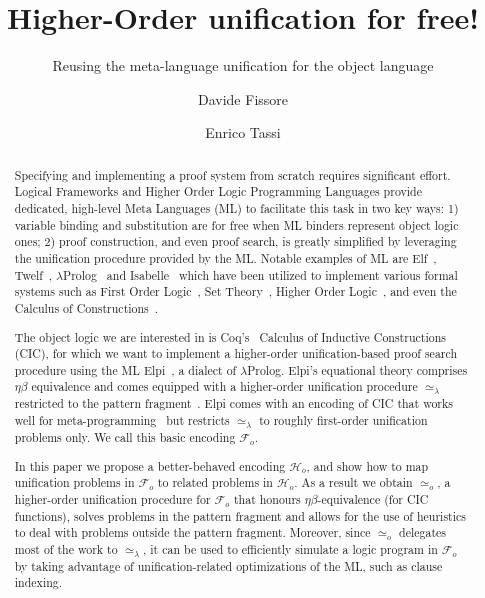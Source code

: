 \documentclass[sigconf,natbib=false,review]{acmart}
\newcommand{\UnifRel}{\ensuremath{\simeq}}
\newcommand{\Uo}{\texorpdfstring{\ensuremath{\UnifRel_o}\xspace}{unif\_o}}
\newcommand{\Ue}{\ensuremath{\UnifRel_\lambda}\xspace}
\newcommand{\Fo}{\texorpdfstring{\ensuremath{\mathcal{F}_{\!o}\xspace}}{Fo}} %
\newcommand{\Ho}{\texorpdfstring{\ensuremath{\mathcal{H}_o}\xspace}{Ho}}
\begin{document}
\title{Higher-Order unification for free!}
\subtitle{Reusing the meta-language unification for the object language}

\author{Davide Fissore}

\author{Enrico Tassi}

\begin{abstract}
  Specifying and implementing a proof system from scratch requires significant effort.
  Logical Frameworks and Higher Order Logic Programming Languages provide
  dedicated, high-level Meta Languages (ML) to facilitate this task in two
  key ways: 1) variable binding and substitution are for free when ML binders
  represent object logic ones; 2) proof construction, and even proof search, is
  greatly simplified by leveraging the unification procedure provided by the ML.
  Notable examples of ML are Elf~\cite{elf}, Twelf~\cite{twelf},
  $\lambda$Prolog~\cite{miller_nadathur_2012} and
  Isabelle~\cite{10.1007/978-3-540-71067-7_7}
  which have been utilized to implement various formal systems such as
  First Order Logic~\cite{felty88cade},
  Set Theory~\cite{10.1007/BF00881873},
  Higher Order Logic~\cite{books/sp/NipkowPW02}, and even the Calculus of
  Constructions~\cite{felty93lics}.

  The object logic we are interested in is %
  Coq's~\cite{Coq-refman} Calculus of Inductive Constructions (CIC), for which 
  we want to implement a higher-order unification-based 
  proof search procedure using the ML
  Elpi~\cite{dunchev15lpar}, a dialect of $\lambda$Prolog.
  Elpi's equational theory comprises
  $\eta\beta$ equivalence and comes equipped with a
  higher-order unification procedure \Ue restricted to the pattern
  fragment~\cite{miller92jsc}.
  Elpi comes with an encoding of CIC that works well
  for meta-programming~\cite{tassi:hal-01637063,tassi:hal-01897468,gregoire:hal-03800154,newtc}
  but restricts \Ue to roughly first-order unification problems only.
  We call this basic encoding \Fo.
  
  In this paper we propose a better-behaved encoding \Ho,
  and show how to map unification problems in \Fo{}
  to related problems in \Ho.
    As a result we obtain \Uo{}, a higher-order unification procedure for \Fo{}
    that honours $\eta\beta$-equivalence (for CIC functions), solves
  problems in the pattern fragment and allows
  for the use of heuristics to deal with problems outside the
  pattern fragment. Moreover, since \Uo{} delegates most of the work to \Ue,
  it can be used to efficiently simulate a logic program in \Fo{} by
  taking advantage of
  unification-related optimizations of the ML, such as clause indexing.

\end{abstract}
\end{document}
